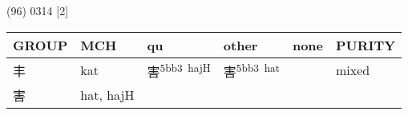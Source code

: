 \documentclass[14pt,a4paper]{scrartcl}
\begin{document}
(96) 0314 {[}2{]}

\begin{longtable}[c]{@{}llllll@{}}
\toprule
\begin{minipage}[b]{0.14\columnwidth}\raggedright\strut
GROUP
\strut\end{minipage} &
\begin{minipage}[b]{0.14\columnwidth}\raggedright\strut
MCH
\strut\end{minipage} &
\begin{minipage}[b]{0.14\columnwidth}\raggedright\strut
qu
\strut\end{minipage} &
\begin{minipage}[b]{0.14\columnwidth}\raggedright\strut
other
\strut\end{minipage} &
\begin{minipage}[b]{0.14\columnwidth}\raggedright\strut
none
\strut\end{minipage} &
\begin{minipage}[b]{0.14\columnwidth}\raggedright\strut
PURITY
\strut\end{minipage}\tabularnewline
\midrule
\endhead
\begin{minipage}[t]{0.14\columnwidth}\raggedright\strut
丰
\strut\end{minipage} &
\begin{minipage}[t]{0.14\columnwidth}\raggedright\strut
kat
\strut\end{minipage} &
\begin{minipage}[t]{0.14\columnwidth}\raggedright\strut
害\textsuperscript{5bb3~hajH}
\strut\end{minipage} &
\begin{minipage}[t]{0.14\columnwidth}\raggedright\strut
害\textsuperscript{5bb3~hat}
\strut\end{minipage} &
\begin{minipage}[t]{0.14\columnwidth}\raggedright\strut
\strut\end{minipage} &
\begin{minipage}[t]{0.14\columnwidth}\raggedright\strut
mixed
\strut\end{minipage}\tabularnewline
\begin{minipage}[t]{0.14\columnwidth}\raggedright\strut
害
\strut\end{minipage} &
\begin{minipage}[t]{0.14\columnwidth}\raggedright\strut
hat, hajH
\strut\end{minipage} &
\begin{minipage}[t]{0.14\columnwidth}\raggedright\strut

\end{minipage}
\end{longtable}
\end{document}
